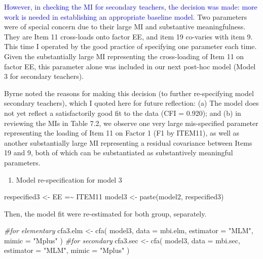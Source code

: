 \documentclass[
]{article}
\newenvironment{Shaded}{\begin{snugshade}}{\end{snugshade}}
\newcommand{\AttributeTok}[1]{\textcolor[rgb]{0.77,0.63,0.00}{#1}}
\newcommand{\CommentTok}[1]{\textcolor[rgb]{0.56,0.35,0.01}{\textit{#1}}}
\newcommand{\FunctionTok}[1]{\textcolor[rgb]{0.00,0.00,0.00}{#1}}
\newcommand{\NormalTok}[1]{#1}
\newcommand{\OtherTok}[1]{\textcolor[rgb]{0.56,0.35,0.01}{#1}}
\newcommand{\StringTok}[1]{\textcolor[rgb]{0.31,0.60,0.02}{#1}}
\providecommand{\tightlist}{%
  \setlength{\itemsep}{0pt}\setlength{\parskip}{0pt}}
\begin{document}
\textcolor{blue}{However, in checking the MI for secondary teachers, the decision was made: more work is needed in establishing an appropriate baseline model.} Two parameters were of special concern due to their large MI and substantive meaningfulness. They are Item 11 cross-loads onto factor EE, and item 19 co-varies with item 9. This time I operated by the good practice of specifying one parameter each time. Given the substantially large MI representing the cross-loading of Item 11 on factor EE, this parameter alone was included in our next post-hoc model (Model 3 for secondary teachers).

Byrne noted the reasons for making this decision (to further re-specifying model secondary teachers), which I quoted here for future reflection: (a) The model does not yet reflect a satisfactorily good fit to the data (CFI = 0.920); and (b) in reviewing the MIs in Table 7.2, we observe one very large mis-specified parameter representing the loading of Item 11 on Factor 1 (F1 by ITEM11), as well as another substantially large MI representing a residual covariance between Items 19 and 9, both of which can be substantiated as substantively meaningful parameters.

\begin{enumerate}
\def\labelenumi{(\arabic{enumi})}
\setcounter{enumi}{2}
\tightlist
\item
  Model re-specification for model 3
\end{enumerate}

\begin{Shaded}
\begin{Highlighting}[]
\NormalTok{respecified3 }\OtherTok{\textless{}{-}} \StringTok{\textquotesingle{}EE =\textasciitilde{} ITEM11}
\StringTok{                 \textquotesingle{}}
\NormalTok{model3 }\OtherTok{\textless{}{-}} \FunctionTok{paste}\NormalTok{(model2, respecified3)}
\end{Highlighting}
\end{Shaded}

Then, the model fit were re-estimated for both group, separately.

\begin{Shaded}
\begin{Highlighting}[]
\CommentTok{\#for elementary}
\NormalTok{cfa3.elm }\OtherTok{\textless{}{-}} 
  \FunctionTok{cfa}\NormalTok{(}
\NormalTok{    model3, }
    \AttributeTok{data =}\NormalTok{ mbi.elm,  }
    \AttributeTok{estimator =} \StringTok{"MLM"}\NormalTok{,}
    \AttributeTok{mimic =} \StringTok{"Mplus"}
\NormalTok{    )}
\CommentTok{\#for secondary}
\NormalTok{cfa3.sec }\OtherTok{\textless{}{-}} 
  \FunctionTok{cfa}\NormalTok{(}
\NormalTok{    model3, }
    \AttributeTok{data =}\NormalTok{ mbi.sec,  }
    \AttributeTok{estimator =} \StringTok{"MLM"}\NormalTok{,}
    \AttributeTok{mimic =} \StringTok{"Mplus"}
\NormalTok{    )}
\end{Highlighting}
\end{Shaded}
\end{document}
